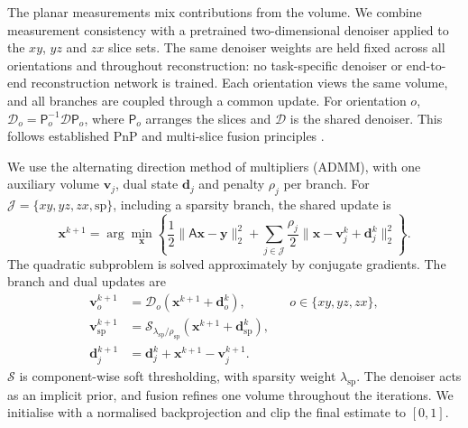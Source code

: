 The planar measurements mix contributions from the volume. We combine measurement consistency with a pretrained two-dimensional denoiser applied to the \(xy\), \(yz\) and \(zx\) slice sets. The same denoiser weights are held fixed across all orientations and throughout reconstruction: no task-specific denoiser or end-to-end reconstruction network is trained. Each orientation views the same volume, and all branches are coupled through a common update. For orientation \(o\), \(\mathcal D_o=\mathsf P_o^{-1}\mathcal D\mathsf P_o\), where \(\mathsf P_o\) arranges the slices and \(\mathcal D\) is the shared denoiser. This follows established PnP and multi-slice fusion principles \cite{venkat2013,majee2021}.

We use the alternating direction method of multipliers (ADMM), with one auxiliary volume \(\mathbf v_j\), dual state \(\mathbf d_j\) and penalty \(\rho_j\) per branch. For \(\mathcal J=\{xy,yz,zx,\mathrm{sp}\}\), including a sparsity branch, the shared update is
\[
\mathbf x^{k+1}=\arg\min_{\mathbf x}
\left\{\frac12\|\mathsf A\mathbf x-\mathbf y\|_2^2+
\sum_{j\in\mathcal J}\frac{\rho_j}{2}
\|\mathbf x-\mathbf v_j^k+\mathbf d_j^k\|_2^2\right\}.
\tag{6}
\]
The quadratic subproblem is solved approximately by conjugate gradients. The branch and dual updates are
\[
\begin{aligned}
\mathbf v_o^{k+1}&=\mathcal D_o(\mathbf x^{k+1}+\mathbf d_o^k),
&&o\in\{xy,yz,zx\},\\
\mathbf v_{\mathrm{sp}}^{k+1}
&=\mathcal S_{\lambda_{\mathrm{sp}}/\rho_{\mathrm{sp}}}
(\mathbf x^{k+1}+\mathbf d_{\mathrm{sp}}^k),\\
\mathbf d_j^{k+1}
&=\mathbf d_j^k+\mathbf x^{k+1}-\mathbf v_j^{k+1}.
\end{aligned}
\tag{7}
\]
\(\mathcal S\) is component-wise soft thresholding, with sparsity weight \(\lambda_{\mathrm{sp}}\). The denoiser acts as an implicit prior, and fusion refines one volume throughout the iterations. We initialise with a normalised backprojection and clip the final estimate to \([0,1]\).
